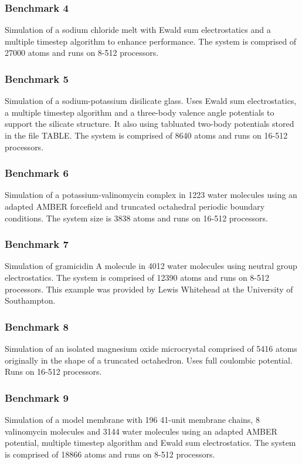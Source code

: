 \subsubsection{Benchmark 4}

Simulation of a sodium chloride melt with Ewald sum electrostatics and
a multiple timestep algorithm to enhance performance. The system is
comprised of 27000 atoms and runs on 8-512 processors.

\subsubsection{Benchmark 5}

Simulation of a sodium-potassium disilicate glass. Uses Ewald sum
electrostatics, a multiple timestep algorithm and a three-body valence
angle potentials to support the silicate structure. It also using
tabluated two-body potentials stored in the file TABLE. The system is
comprised of 8640 atoms and runs on 16-512 processors.

\subsubsection{Benchmark 6}

Simulation of a potassium-valinomycin complex in 1223 water molecules
using an adapted AMBER forcefield and truncated octahedral periodic
boundary conditions. The system size is 3838 atoms and runs on 16-512
processors.

\subsubsection{Benchmark 7}

Simulation of gramicidin A molecule in 4012 water molecules using
neutral group electrostatics. The system is comprised of 12390 atoms
and runs on 8-512 processors. This example was provided by Lewis
Whitehead at the University of Southampton.

\subsubsection{Benchmark 8}

Simulation of an isolated magnesium oxide microcrystal comprised of
5416 atoms originally in the shape of a truncated octahedron. Uses
full coulombic potential. Runs on 16-512 processors.

\subsubsection{Benchmark 9}

Simulation of a model membrane with 196 41-unit membrane chains, 8
valinomycin molecules and 3144 water molecules using an adapted AMBER
potential, multiple timestep algorithm and Ewald sum electrostatics. 
The system is comprised of 18866 atoms and runs on 8-512 processors.

\clearpage


